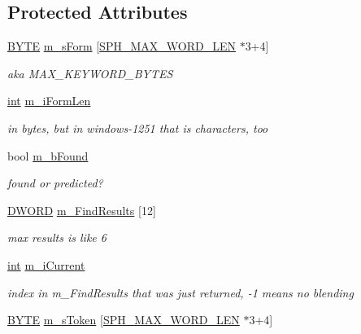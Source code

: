 \subsection*{Protected Attributes}
\begin{DoxyCompactItemize}
\item 
\hyperlink{sphinxstd_8h_a4ae1dab0fb4b072a66584546209e7d58}{B\-Y\-T\-E} \hyperlink{classCSphAotTokenizerTmpl_ac35cfe3d9fd0f9800e672931235d0190}{m\-\_\-s\-Form} \mbox{[}\hyperlink{sphinx_8h_ab0f6d383751adea7c80ed4ff4c36532c}{S\-P\-H\-\_\-\-M\-A\-X\-\_\-\-W\-O\-R\-D\-\_\-\-L\-E\-N} $\ast$3+4\mbox{]}
\begin{DoxyCompactList}\small\item\em aka M\-A\-X\-\_\-\-K\-E\-Y\-W\-O\-R\-D\-\_\-\-B\-Y\-T\-E\-S \end{DoxyCompactList}\item 
\hyperlink{sphinxexpr_8cpp_a4a26e8f9cb8b736e0c4cbf4d16de985e}{int} \hyperlink{classCSphAotTokenizerTmpl_a8d4006ffbf0fde5cd103bcbd55086253}{m\-\_\-i\-Form\-Len}
\begin{DoxyCompactList}\small\item\em in bytes, but in windows-\/1251 that is characters, too \end{DoxyCompactList}\item 
bool \hyperlink{classCSphAotTokenizerTmpl_a30c0c1975f67f53e133833faadd6b971}{m\-\_\-b\-Found}
\begin{DoxyCompactList}\small\item\em found or predicted? \end{DoxyCompactList}\item 
\hyperlink{sphinxstd_8h_a798af1e30bc65f319c1a246cecf59e39}{D\-W\-O\-R\-D} \hyperlink{classCSphAotTokenizerTmpl_acfe01b47934c1d285da378c9f3be1189}{m\-\_\-\-Find\-Results} \mbox{[}12\mbox{]}
\begin{DoxyCompactList}\small\item\em max results is like 6 \end{DoxyCompactList}\item 
\hyperlink{sphinxexpr_8cpp_a4a26e8f9cb8b736e0c4cbf4d16de985e}{int} \hyperlink{classCSphAotTokenizerTmpl_aebade03c728c748c57b305217d05e1c9}{m\-\_\-i\-Current}
\begin{DoxyCompactList}\small\item\em index in m\-\_\-\-Find\-Results that was just returned, -\/1 means no blending \end{DoxyCompactList}\item 
\hyperlink{sphinxstd_8h_a4ae1dab0fb4b072a66584546209e7d58}{B\-Y\-T\-E} \hyperlink{classCSphAotTokenizerTmpl_a83ceca1f2abf18599dc9a4ac056bd44e}{m\-\_\-s\-Token} \mbox{[}\hyperlink{sphinx_8h_ab0f6d383751adea7c80ed4ff4c36532c}{S\-P\-H\-\_\-\-M\-A\-X\-\_\-\-W\-O\-R\-D\-\_\-\-L\-E\-N} $\ast$3+4\mbox{]}

\end{DoxyCompactItemize}

